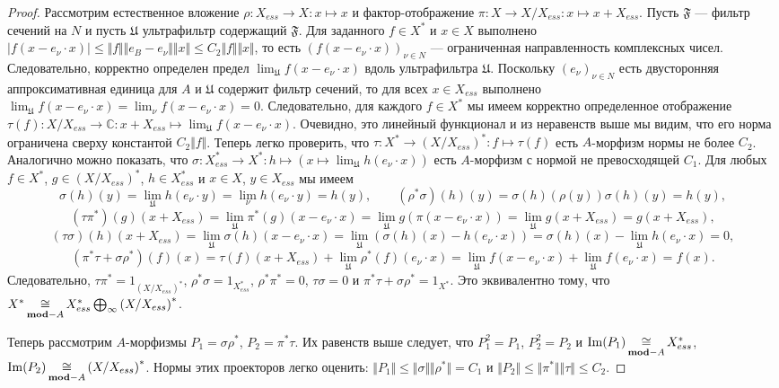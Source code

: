 \begin{proof} Рассмотрим естественное вложение $\rho:X_{ess}\to X:x\mapsto x$ и
фактор-отображение $\pi:X\to X/X_{ess}:x\mapsto x+X_{ess}$. Пусть $\mathfrak{F}$
--- фильтр сечений на $N$ и пусть $\mathfrak{U}$ ультрафильтр содержащий
$\mathfrak{F}$. Для заданного $f\in X ^*$ и $x\in X $ выполнено $|f(x-e_\nu\cdot
x)|\leq\Vert f\Vert\Vert e_B - e_\nu\Vert\Vert x\Vert\leq C_2\Vert f\Vert\Vert
x\Vert$, то есть ${(f(x-e_\nu\cdot x))}_{\nu\in N}$ --- ограниченная
направленность комплексных чисел. Следовательно, корректно определен предел
$\lim_{\mathfrak{U}}f(x-e_\nu\cdot x)$ вдоль ультрафильтра $\mathfrak{U}$.
Поскольку ${(e_\nu)}_{\nu\in N}$ есть двусторонняя аппроксимативная единица для
$A$ и $\mathfrak{U}$ содержит фильтр сечений, то для всех $x\in X_{ess}$
выполнено $\lim_{\mathfrak{U}}f(x-e_\nu\cdot x)=\lim_{\nu}f(x-e_\nu\cdot x)=0$.
Следовательно, для каждого $f\in X ^*$ мы имеем корректно определенное
отображение $\tau(f):X /X_{ess}\to \mathbb{C}:x+X_{ess}\mapsto
\lim_{\mathfrak{U}} f(x-e_\nu\cdot x)$. Очевидно, это линейный функционал и из
неравенств выше мы видим, что его норма ограничена сверху константой $C_2\Vert
f\Vert$. Теперь легко проверить, что 
$\tau:X^*\to {(X/ X_{ess})}^*:f\mapsto \tau(f)$ 
есть $A$-морфизм нормы не более $C_2$. Аналогично можно показать, что
$\sigma:X_{ess}^*\to X^*:h\mapsto(x\mapsto \lim_{\mathfrak{U}}h(e_\nu\cdot x))$
есть $A$-морфизм с нормой не превосходящей $C_1$. Для любых $f\in X^*$, 
$g\in {(X/X_{ess})}^*$, $h\in X_{ess}^*$ и $x\in X$, $y\in X_{ess}$ мы имеем
$$
\sigma(h)(y)
=\lim_{\mathfrak{U}}h(e_\nu\cdot y)
=\lim_{\nu}h(e_\nu\cdot y)
=h(y),
\qquad
(\rho^*\sigma)(h)(y)
=\sigma(h)(\rho(y))
\sigma(h)(y)
=h(y),
$$
$$
(\tau\pi^*)(g)(x+X_{ess})
=\lim_{\mathfrak{U}}\pi^*(g)(x-e_\nu\cdot x)
=\lim_{\mathfrak{U}}g(\pi(x-e_\nu\cdot x))
=\lim_{\mathfrak{U}}g(x+X_{ess})
=g(x+X_{ess}),
$$
$$
(\tau\sigma)(h)(x+X_{ess})
=\lim_{\mathfrak{U}}\sigma(h)(x-e_\nu\cdot x)
=\lim_{\mathfrak{U}}(\sigma(h)(x)-h(e_\nu\cdot x))
=\sigma(h)(x)-\lim_{\mathfrak{U}}h(e_\nu\cdot x)=0,
$$
$$
(\pi^*\tau + \sigma\rho^*)(f)(x)
=\tau(f)(x+X_{ess})+\lim_{\mathfrak{U}}\rho^*(f)(e_\nu\cdot x)
=\lim_{\mathfrak{U}}f(x - e_\nu\cdot x)+\lim_{\mathfrak{U}}f(e_\nu\cdot x)
=f(x).
$$
Следовательно, $\tau \pi^*=1_{{(X/X_{ess})}^*}$, $\rho^*\sigma=1_{X_{ess}^*}$,
$\rho^*\pi^*=0$, $\tau\sigma=0$ и $\pi^*\tau+\sigma\rho^*=1_{X^*}$. Это
эквивалентно тому, что 
$X^*\mathop{\mathbin{\cong}}\limits_{\mathbf{mod}-A}X_{ess}^*\bigoplus_\infty {(X/X_{ess})}^*$.

Теперь рассмотрим $A$-морфизмы $P_1=\sigma\rho^*$, $P_2=\pi^*\tau$. Их равенств
выше следует, что $P_1^2=P_1$, $P_2^2=P_2$ и
$\operatorname{Im}(P_1)\mathop{\mathbin{\cong}}\limits_{\mathbf{mod}-A}X_{ess}^*$,
$\operatorname{Im}(P_2)\mathop{\mathbin{\cong}}\limits_{\mathbf{mod}-A} {(X/X_{ess})}^*$. Нормы этих
проекторов легко оценить: $\Vert P_1\Vert\leq\Vert \sigma\Vert\Vert
\rho^*\Vert=C_1$ и $\Vert P_2\Vert\leq \Vert \pi^*\Vert\Vert\tau\Vert\leq C_2$.


\end{proof}
